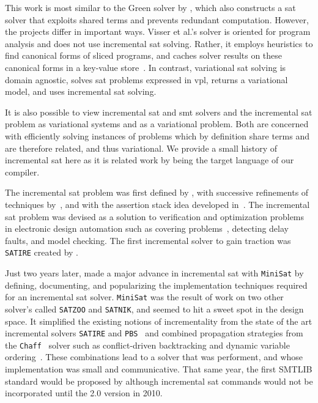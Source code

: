 \label{section:related-work:similar-solvers}
%
This work is most similar to the Green solver by \citet{VGD:FSE12}, which also
constructs a \ac{sat} solver that exploits shared terms and prevents redundant
computation. However, the projects differ in important ways. Visser et al.'s
solver is oriented for program analysis and does not use incremental \ac{sat}
solving. Rather, it employs heuristics to find canonical forms of sliced
programs, and caches solver results on these canonical forms in a key-value
store~\citep{redis}. In contrast, variational \ac{sat} solving is domain
agnostic, solves \ac{sat} problems expressed in \ac{vpl}, returns a variational
model, and uses incremental \ac{sat} solving.

It is also possible to view incremental \ac{sat} and \ac{smt} solvers and the
incremental \ac{sat} problem as variational systems and as a variational
problem. Both are concerned with efficiently solving instances of problems which
by definition share terms and are therefore related, and thus variational. We
provide a small history of incremental \ac{sat} here as it is related work by
being the target language of our compiler.

The incremental \ac{sat} problem was first defined by \citet{hooker_1993}, with
successive refinements of techniques by~\citet{branch-bound}, and with the
assertion stack idea developed in~\citet{kim2000solving}. The
incremental \ac{sat} problem was devised as a solution to verification and
optimization problems in electronic design automation such as covering
problems~\cite{10.1145/217474.217603}, detecting delay
faults\cite{10.1145/343647.343801}, and model
checking\cite{Clarke:1986:AVF:5397.5399}. The first incremental solver to gain
traction was \texttt{SATIRE} created by \citet{10.1145/378239.379019}.

Just two years later, \citet{10.1007/978-3-540-24605-3_37} made a major advance
in incremental \ac{sat} with \texttt{MiniSat} by defining, documenting, and
popularizing the implementation techniques required for an incremental \ac{sat}
solver. \texttt{MiniSat} was the result of work on two other solver's called
\texttt{SATZOO} and \texttt{SATNIK}, and seemed to hit a sweet spot in the
design space. It simplified the existing notions of incrementality from the
state of the art incremental solvers \texttt{SATIRE} and
\texttt{PBS}~\cite{10.1145/774572.774638} and combined propagation strategies
from the \texttt{Chaff}~\cite{Moskewicz:2001:CEE:378239.379017} solver such as
conflict-driven backtracking\cite{Zhang:2001:ECD:603095.603153} and dynamic
variable ordering~\cite{Moskewicz:2001:CEE:378239.379017}. These combinations
lead to a solver that was performent, and whose implementation was small and
communicative. That same year, the first SMTLIB standard would be proposed by
\citet{SMT-LIBformat} although incremental \ac{sat} commands would not be
incorporated until the 2.0 version\cite{BarST-RR-10} in 2010.


